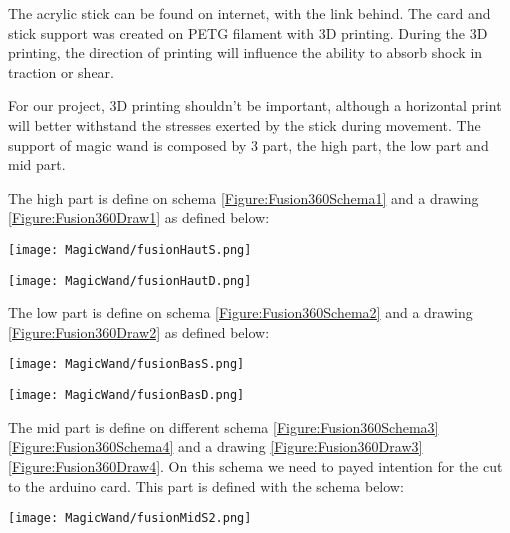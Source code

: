 The acrylic stick can be found on internet, with the link behind. The card and stick support was created on PETG filament with 3D printing. During the 3D printing, the direction of printing will influence the ability to absorb shock in traction or shear. 


For our project, 3D printing shouldn't be important, although a horizontal print will better withstand the stresses exerted by the stick during movement. The support of magic wand is composed by 3 part, the high part, the low part and mid part. 


The high part is define on schema \ref{Figure:Fusion360Schema1} and a drawing \ref{Figure:Fusion360Draw1} as defined \cite{Fusion:2024} below: 

\begin{center}
    \texttt{[image: MagicWand/fusionHautS.png]}
     \label{Figure:Fusion360Schema1}	
\end{center}

\begin{center}
    \texttt{[image: MagicWand/fusionHautD.png]}
     \label{Figure:Fusion360Draw1}	
\end{center}


The low part is define on schema \ref{Figure:Fusion360Schema2} and a drawing \ref{Figure:Fusion360Draw2} as defined \cite{Fusion:2024b} below: 

\begin{center}
    \texttt{[image: MagicWand/fusionBasS.png]}
     \label{Figure:Fusion360Schema2}	
\end{center}

\begin{center}
    \texttt{[image: MagicWand/fusionBasD.png]}
     \label{Figure:Fusion360Draw2}	
\end{center}

The mid part is define on different schema \ref{Figure:Fusion360Schema3} \ref{Figure:Fusion360Schema4} and a drawing \ref{Figure:Fusion360Draw3} \ref{Figure:Fusion360Draw4}. On this schema we need to payed intention for the cut to the arduino card. This part is defined with the schema \cite{Fusion:2024c} below: 

\begin{center}
    \texttt{[image: MagicWand/fusionMidS2.png]}
     \label{Figure:Fusion360Schema3}	
\end{center}


